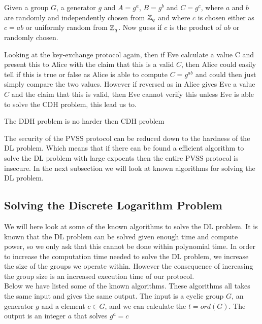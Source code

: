\begin{defi} 
    Given a group $G$, a generator $g$ and $A = g^a$, $B = g^b$ and $C = g^c$, where $a$ and $b$ are randomly and independently chosen from $\mathbb{Z}_q$ and where $c$ is chosen either as $c = ab$ or uniformly random from $\mathbb{Z}_q$. Now guess if $c$ is the product of $ab$ or randomly chosen.   
\end{defi}

\noindent
Looking at the key-exchange protocol again, then if Eve calculate a value C and present this to Alice with the claim that this is a valid $C$, then Alice could easily tell if this is true or false as Alice is able to compute $C = g^{ab}$ and could then just simply compare the two values. However if reversed as in Alice gives Eve a value $C$ and the claim that this is valid, then Eve cannot verify this unless Eve is able to solve the CDH problem, this lead us to.

\begin{lemma}
The DDH problem is no harder then CDH problem
\end{lemma}

\noindent
The security of the PVSS protocol can be reduced down to the hardness of the DL problem. Which means that if there can be found a efficient algorithm to solve the DL problem with large expoents then the entire PVSS protocol is insecure. In the next subsection we will look at known algorithms for solving the DL problem. 

\subsection{Solving the Discrete Logarithm Problem}
\label{sec:solving_the_discrete_logarithm_problem}
We will here look at some of the known algorithms to solve the DL problem. It is known that the DL problem can be solved given enough time and compute power, so we only ask that this cannot be done within polynomial time. In order to increase the computation time needed to solve the DL problem, we increase the size of the groups we operate within. However the consequence of increasing the group size is an increased execution time of our protocol. \\

\noindent
Below we have listed some of the known algorithms. These algorithms all takes the same input and gives the same output. The input is a cyclic group $G$, an generator $g$ and a element $c \in G$, and we can calculate the $t = ord(G)$. The output is an integer $a$ that solves $g^a = c$

